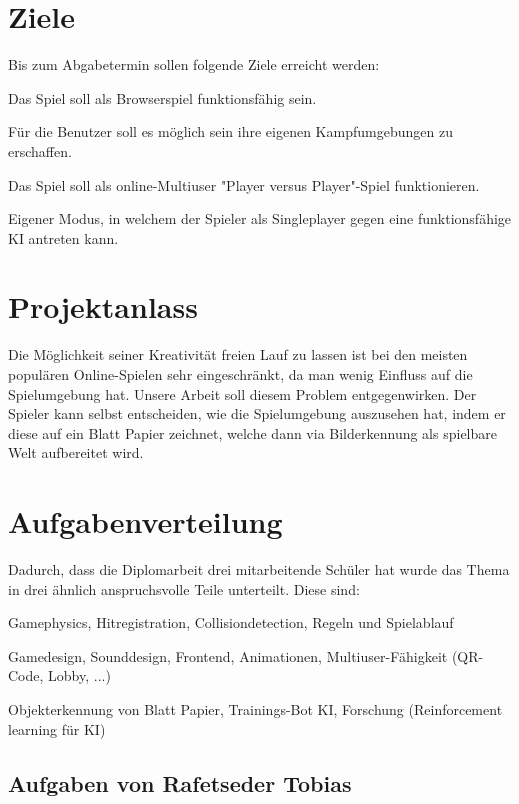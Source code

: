 \section{Ziele}
Bis zum Abgabetermin sollen folgende Ziele erreicht werden:
\begin{compactitem}
    \item Das Spiel soll als Browserspiel funktionsfähig sein.
    \item Für die Benutzer soll es möglich sein ihre eigenen Kampfumgebungen zu erschaffen.
    \item Das Spiel soll als online-Multiuser "Player versus Player"-Spiel funktionieren.
    \item Eigener Modus, in welchem der Spieler als Singleplayer gegen eine funktionsfähige KI antreten kann.
\end{compactitem}

\section{Projektanlass}
Die Möglichkeit seiner Kreativität freien Lauf zu lassen ist bei den meisten populären
Online-Spielen sehr eingeschränkt, da man wenig Einfluss auf die Spielumgebung hat.
Unsere Arbeit soll diesem Problem entgegenwirken. Der Spieler kann selbst entscheiden,
wie die Spielumgebung auszusehen hat, indem er diese auf ein Blatt Papier zeichnet,
welche dann via Bilderkennung als spielbare Welt aufbereitet wird.


\section{Aufgabenverteilung}
Dadurch, dass die Diplomarbeit drei mitarbeitende Schüler hat wurde das Thema in drei ähnlich
anspruchsvolle Teile unterteilt. Diese sind:
\begin{compactitem}
    \item Gamephysics, Hitregistration, Collisiondetection, Regeln und Spielablauf
    \item Gamedesign, Sounddesign, Frontend, Animationen, Multiuser-Fähigkeit (QR-Code, Lobby, ...)
    \item Objekterkennung von Blatt Papier, Trainings-Bot KI, Forschung (Reinforcement learning für KI)
\end{compactitem}

\subsection{Aufgaben von Rafetseder Tobias}

